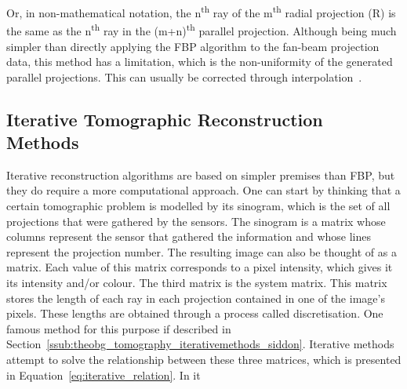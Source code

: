 Or, in non-mathematical notation, the n\textsuperscript{th} ray of the
m\textsuperscript{th} radial projection (R) is the same as the
n\textsuperscript{th} ray in the (m+n)\textsuperscript{th} parallel
projection. Although being much simpler than directly applying the
\gls{FBP} algorithm to the fan-beam projection data, this method has a
limitation, which is the non-uniformity of the generated parallel
projections. This can usually be corrected through
interpolation~\cite{Kak2001a}. 

\subsection{Iterative Tomographic Reconstruction Methods}%
\label{sub:theobg_tomography_iterativemethods}

Iterative reconstruction algorithms are based on simpler premises than
\gls{FBP}, but they do require a more computational approach. One can
start by thinking that a certain tomographic problem is modelled by its
sinogram, which is the set of all projections that were gathered by the
sensors. The sinogram is a matrix whose columns represent the sensor
that gathered the information and whose lines represent the projection
number. The resulting image can also be thought of as a matrix. Each
value of this matrix corresponds to a pixel intensity, which gives it
its intensity and/or colour. The third matrix is the system matrix. This
matrix stores the length of each ray in each projection contained in one
of the image's pixels. These lengths are obtained through a process
called discretisation. One famous method for this purpose if described
in Section~\ref{ssub:theobg_tomography_iterativemethods_siddon}.
Iterative methods attempt to solve the relationship between these three
matrices, which is presented in Equation~\ref{eq:iterative_relation}. In
it~



